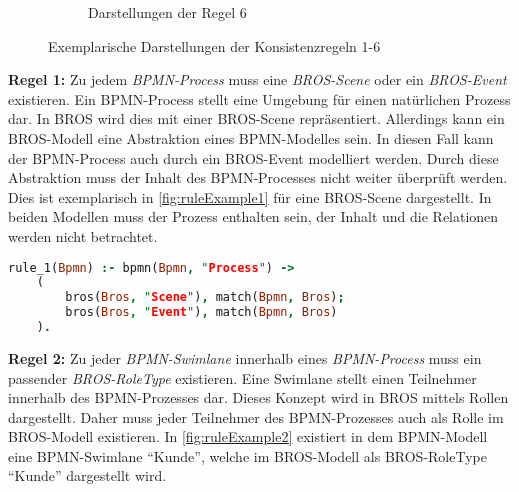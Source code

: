 \begin{figure}
\begin{subfigure}{0.4\textwidth}
%
        \caption{Darstellungen der Regel 6}%
        \label{fig:ruleExample6}
    \end{subfigure}
    \caption{Exemplarische Darstellungen der Konsistenzregeln 1-6}%
    \label{fig:ruleExamples}
\end{figure}

\textbf{Regel 1:} 
Zu jedem \emph{BPMN-Process} muss eine \emph{BROS-Scene} oder ein \emph{BROS-Event} existieren.
Ein BPMN-Process stellt eine Umgebung für einen natürlichen Prozess dar.
In BROS wird dies mit einer BROS-Scene repräsentiert.
Allerdings kann ein BROS-Modell eine Abstraktion eines BPMN-Modelles sein.
In diesen Fall kann der BPMN-Process auch durch ein BROS-Event modelliert werden.
Durch diese Abstraktion muss der Inhalt des BPMN-Processes nicht weiter überprüft werden.
Dies ist exemplarisch in \cref{fig:ruleExample1} für eine BROS-Scene dargestellt.
In beiden Modellen muss der Prozess enthalten sein, der Inhalt und die Relationen werden nicht betrachtet.

\begin{lstlisting}[language=Prolog, caption=Formalisierung der Regel 1, label=lst:rule_1]
rule_1(Bpmn) :- bpmn(Bpmn, "Process") ->
    (
        bros(Bros, "Scene"), match(Bpmn, Bros);
        bros(Bros, "Event"), match(Bpmn, Bros)
    ).
\end{lstlisting}

\textbf{Regel 2:}
Zu jeder \emph{BPMN-Swimlane} innerhalb eines \emph{BPMN-Process} muss ein passender \emph{BROS-RoleType} existieren.
Eine Swimlane stellt einen Teilnehmer innerhalb des BPMN-Prozesses dar. 
Dieses Konzept wird in BROS mittels Rollen dargestellt.
Daher muss jeder Teilnehmer des BPMN-Prozesses auch als Rolle im BROS-Modell existieren.
In \cref{fig:ruleExample2} existiert in dem BPMN-Modell eine BPMN-Swimlane ``Kunde'', welche im BROS-Modell als BROS-RoleType ``Kunde'' dargestellt wird.


